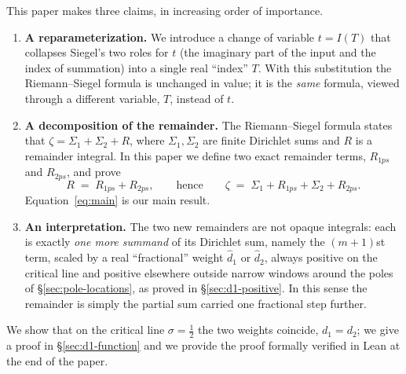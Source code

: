 \documentclass[11pt]{article}
\theoremstyle{definition}
\begin{document}
This paper makes three claims, in increasing order of importance.

\begin{enumerate}
\item \textbf{A reparameterization.} We introduce a change of variable
$t=I(T)$ that collapses Siegel's two roles for $t$ (the imaginary part of the
input and the index of summation) into a single real ``index'' $T$. With this
substitution the Riemann--Siegel formula is unchanged in value; it is the
\emph{same} formula, viewed through a different variable, $T$, instead of $t$.

\item \textbf{A decomposition of the remainder.} The Riemann--Siegel formula
states that
$\zeta = \Sigma_1 + \Sigma_2 + R$, where $\Sigma_1,\Sigma_2$ are finite Dirichlet
sums and $R$ is a remainder integral. In this paper we define two exact
remainder terms,
$R_{1ps}$ and $R_{2ps}$, and prove
\begin{equation}\label{eq:main}
R \;=\; R_{1ps} + R_{2ps},
\qquad\text{hence}\qquad
\zeta \;=\; \Sigma_{1} + R_{1ps} + \Sigma_{2} + R_{2ps}.
\end{equation}
Equation~\eqref{eq:main} is our main result.

\item \textbf{An interpretation.} The two new remainders are not opaque
integrals: each is exactly \emph{one more summand} of its Dirichlet sum,
namely the $(m+1)$st term, scaled by a real ``fractional'' weight
$\hat d_1$ or $\hat d_2$, always positive on the critical line and positive
elsewhere outside narrow windows around the poles of
\S\ref{sec:pole-locations}, as proved in \S\ref{sec:d1-positive}.
In this sense the remainder is simply the partial sum
carried one fractional step further.
\end{enumerate}

We show that on the critical line $\sigma=\tfrac12$
the two weights coincide, $d_1=d_2$; we give a proof in
\S\ref{sec:d1-function} and we provide the proof formally verified in Lean at
the end of the paper.
\end{document}
